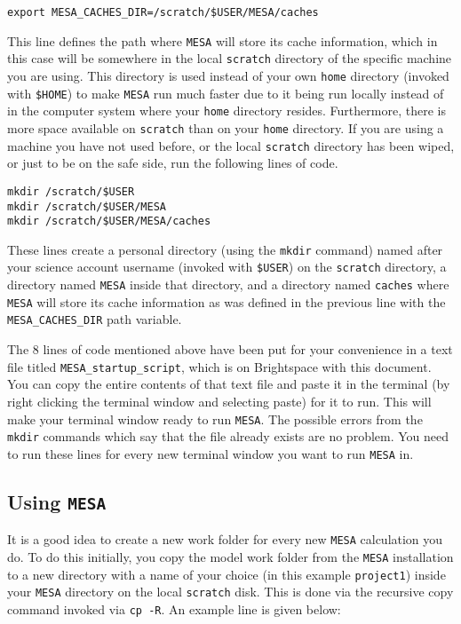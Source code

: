 \documentclass[11pt,a4paper]{article}
\begin{document}
\begin{lstlisting}
export MESA_CACHES_DIR=/scratch/$USER/MESA/caches
\end{lstlisting}

\noindent
This line defines the path where \texttt{MESA} will store its cache information, which in this case will be somewhere in the local \texttt{scratch} directory of the specific machine you are using. This directory is used instead of your own \texttt{home} directory (invoked with \texttt{\$HOME}) to make \texttt{MESA} run much faster due to it being run locally instead of in the computer system where your \texttt{home} directory resides. Furthermore, there is more space available on \texttt{scratch} than on your \texttt{home} directory. If you are using a machine you have not used before, or the local \texttt{scratch} directory has been wiped, or just to be on the safe side, run the following lines of code. 

\begin{lstlisting}
mkdir /scratch/$USER
mkdir /scratch/$USER/MESA
mkdir /scratch/$USER/MESA/caches
\end{lstlisting}

\noindent
These lines create a personal directory (using the \texttt{mkdir} command) named after your science account username (invoked with \texttt{\$USER}) on the \texttt{scratch} directory, a directory named \texttt{MESA} inside that directory, and a directory named \texttt{caches} where \texttt{MESA} will store its cache information as was defined in the previous line with the \texttt{MESA\_CACHES\_DIR} path variable.

\bigskip\noindent
The 8 lines of code mentioned above have been put for your convenience in a text file titled \texttt{MESA\_startup\_script}, which is on Brightspace with this document. You can copy the entire contents of that text file and paste it in the terminal (by right clicking the terminal window and selecting paste) for it to run. This will make your terminal window ready to run \texttt{MESA}. The possible errors from the \texttt{mkdir} commands which say that the file already exists are no problem. You need to run these lines for every new terminal window you want to run \texttt{MESA} in.

\subsection{Using \texttt{MESA}}

It is a good idea to create a new work folder for every new \texttt{MESA} calculation you do. To do this initially, you copy the model work folder from the \texttt{MESA} installation to a new directory with a name of your choice (in this example \texttt{project1}) inside your \texttt{MESA} directory on the local \texttt{scratch} disk. This is done via the recursive copy command invoked via \texttt{cp -R}. An example line is given below:
\end{document}
